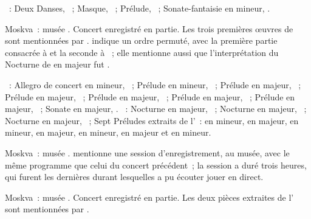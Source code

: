 \begin{description}
 \textsc{\Scriabine{}}~: Deux Danses, ~; Masque, 
 ~; Prélude,  ~; Sonate-fantaisie en \kG \Sharp
 mineur, .
 \item[\DateWithWeekDay{1960-07-18}]
 Moskva~: musée \Scriabine{}.
 Concert enregistré en partie.
 Les trois premières œuvres de \Scriabine{} sont mentionnées par
 \citet[p.~13]{Johansson}.
 \citet[p.~186]{Nekrasova08} indique un ordre permuté, avec la première
 partie consacrée à \Scriabine{} et la seconde à \Chopin{}~; elle mentionne
 aussi que l'interprétation du Nocturne de \Chopin{} en \kE \Flat majeur fut
 .

 \textsc{\Scriabine{}}~: Allegro de concert en \kB \Flat mineur, ~;
 Prélude en \kG mineur,  ~; Prélude en \kB majeur,
  ~; Prélude en \kF \Sharp majeur,  ~;
 Prélude en \kD majeur,  ~; Prélude en \kG majeur,
  ~; Prélude en \kA \Flat majeur,  ~;
 Sonate en \kF \Sharp majeur, .
 \textsc{\Chopin{}}~: Nocturne en \kE \Flat majeur,  ~;
 Nocturne en \kF majeur,  ~; Nocturne en \kF \Sharp
 majeur,  ~; Sept Préludes extraits de l'~:
  en \kE \Flat mineur,  en \kD \Flat majeur,
  en \kB \Flat mineur,  en \kA \Flat majeur,
  en \kF mineur,  en \kB \Flat majeur et 
 en \kG mineur.
 \item[\DateWithWeekDay{1960-07-20}]
 Moskva~: musée \Scriabine{}.
 \citet[p.~188]{Nekrasova08} mentionne une session d'enregistrement, au
 musée, avec le même programme que celui du concert précédent~; la session a
 duré trois heures, qui furent les dernières durant lesquelles
 \citeauthor{Nekrasova08} a pu écouter \Sofronitsky{} jouer en direct.
 \item[\DateWithWeekDay{1960-07-22}]
 Moskva~: musée \Scriabine{}.
 Concert enregistré en partie.
 Les deux pièces extraites de l' sont mentionnées par
 \citet[p.~13]{Johansson}.


\end{description}
